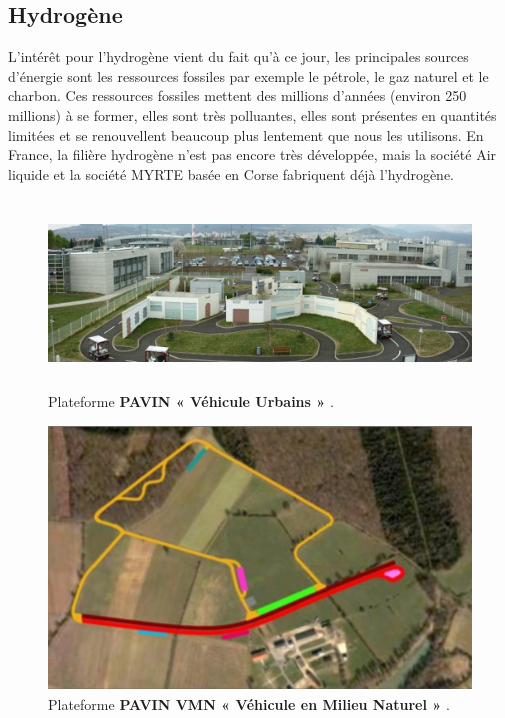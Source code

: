   \subsection{Hydrogène}
  
 
 L'intérêt pour l'hydrogène vient du fait qu'à ce jour, les principales sources d'énergie sont les ressources fossiles par exemple le pétrole, le gaz naturel et le charbon. Ces ressources fossiles mettent des millions d'années (environ 250 millions) à se former, elles sont très polluantes, elles sont présentes en quantités limitées et se renouvellent beaucoup plus lentement que nous les utilisons. En France, la filière hydrogène n'est pas encore très développée, mais la société Air liquide et la société  MYRTE basée en Corse fabriquent déjà l'hydrogène. 
  \begin{figure}[H]
  	\centerline{
  		\includegraphics[height=5cm]{images_these/pavin.jpg}}
  	\caption[Plateforme PAVIN « Véhicule Urbains »]{ Plateforme \textbf{PAVIN « Véhicule Urbains »} \cite{plateforme}.}
  	\label{pavin}
  \end{figure}
  \begin{figure}[H]
  	\centerline{
  		\includegraphics[height=7cm]{images_these/pavin_VMN.png}}
  	\caption[Plateforme PAVIN VMN « Véhicule en Milieu Naturel »]{ Plateforme \textbf{PAVIN VMN « Véhicule en Milieu Naturel »} \cite{plateforme}.}
  	\label{pavin_vmn}
  \end{figure}
